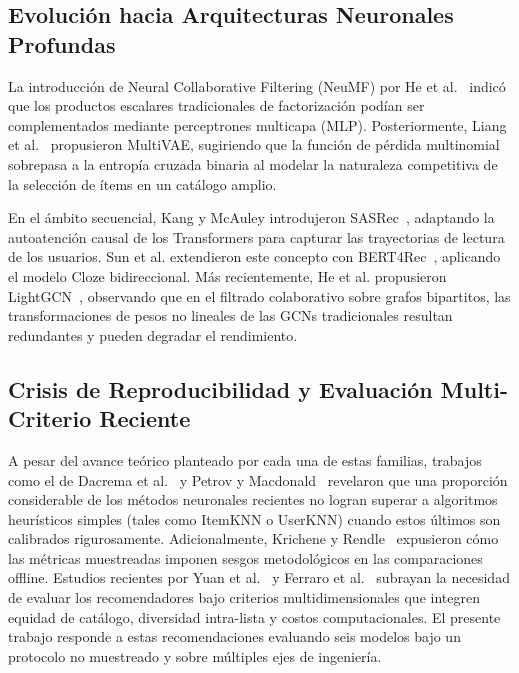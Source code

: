 \documentclass[journal]{IEEEtran}
\begin{document}
\subsection{Evolución hacia Arquitecturas Neuronales Profundas}
La introducción de Neural Collaborative Filtering (NeuMF) por He et al.~\cite{he2017neural} indicó que los productos escalares tradicionales de factorización podían ser complementados mediante perceptrones multicapa (MLP). Posteriormente, Liang et al.~\cite{liang2018variational} propusieron MultiVAE, sugiriendo que la función de pérdida multinomial sobrepasa a la entropía cruzada binaria al modelar la naturaleza competitiva de la selección de ítems en un catálogo amplio.

En el ámbito secuencial, Kang y McAuley introdujeron SASRec~\cite{kang2018self}, adaptando la autoatención causal de los Transformers para capturar las trayectorias de lectura de los usuarios. Sun et al. extendieron este concepto con BERT4Rec~\cite{sun2019bert4rec}, aplicando el modelo Cloze bidireccional. Más recientemente, He et al. propusieron LightGCN~\cite{he2020lightgcn}, observando que en el filtrado colaborativo sobre grafos bipartitos, las transformaciones de pesos no lineales de las GCNs tradicionales resultan redundantes y pueden degradar el rendimiento.

\subsection{Crisis de Reproducibilidad y Evaluación Multi-Criterio Reciente}
A pesar del avance teórico planteado por cada una de estas familias, trabajos como el de Dacrema et al.~\cite{dacrema2019really} y Petrov y Macdonald~\cite{petrov2023effective} revelaron que una proporción considerable de los métodos neuronales recientes no logran superar a algoritmos heurísticos simples (tales como ItemKNN o UserKNN) cuando estos últimos son calibrados rigurosamente. Adicionalmente, Krichene y Rendle~\cite{krichene2020sampled} expusieron cómo las métricas muestreadas imponen sesgos metodológicos en las comparaciones offline. Estudios recientes por Yuan et al.~\cite{yuan2023benchmarking} y Ferraro et al.~\cite{ferraro2024fairness} subrayan la necesidad de evaluar los recomendadores bajo criterios multidimensionales que integren equidad de catálogo, diversidad intra-lista y costos computacionales. El presente trabajo responde a estas recomendaciones evaluando seis modelos bajo un protocolo no muestreado y sobre múltiples ejes de ingeniería.
\end{document}
